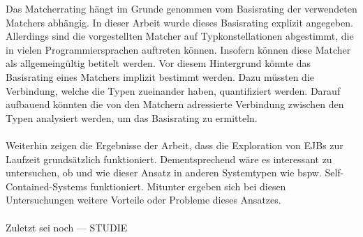 Das Matcherrating hängt im Grunde genommen vom Basisrating der verwendeten Matchers abhängig. In dieser Arbeit wurde dieses Basisrating explizit angegeben. Allerdings sind die vorgestellten Matcher auf Typkonstellationen abgestimmt, die in vielen Programmiersprachen auftreten können. Insofern können diese Matcher als allgemeingültig betitelt werden. Vor diesem Hintergrund könnte das Basisrating eines Matchers implizit bestimmt werden. Dazu müssten die Verbindung, welche die Typen zueinander haben, quantifiziert werden. Darauf aufbauend könnten die von den Matchern adressierte Verbindung zwischen den Typen analysiert werden, um das Basisrating zu ermitteln.
\\\\
Weiterhin zeigen die Ergebnisse der Arbeit, dass die Exploration von EJBs zur Laufzeit grundsätzlich funktioniert. Dementsprechend wäre es interessant zu untersuchen, ob und wie dieser Ansatz in anderen Systemtypen wie bspw. Self-Contained-Systems funktioniert. Mitunter ergeben sich bei diesen Untersuchungen weitere Vorteile oder Probleme dieses Ansatzes.
\\\\
Zuletzt sei noch --- STUDIE